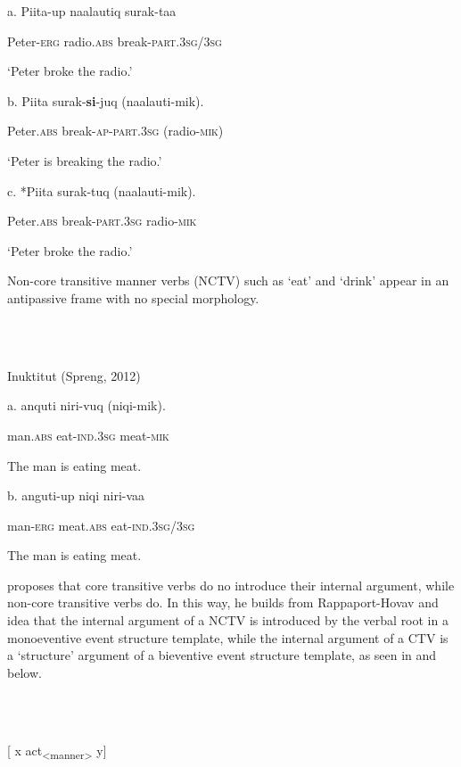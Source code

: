 \documentclass[output=paper,modfonts,nonflat]{langsci/langscibook}
\begin{document}
a.   Piita-up  naalautiq  surak-taa

  Peter{}-\textsc{erg}  radio.\textsc{abs}  break-\textsc{part}.3\textsc{sg}/3\textsc{sg}

  ‘Peter broke the radio.’

b.  Piita    surak-\textbf{si}{}-juq    (naalauti-mik).

  Peter.\textsc{abs}  break-\textsc{ap}{}-\textsc{part}.3\textsc{sg}  (radio{}-\textsc{mik})

  ‘Peter is breaking the radio.’

c.   *Piita    surak-tuq    (naalauti-mik).  

  Peter.\textsc{abs}  break{}-\textsc{part}.3\textsc{sg}  radio{}-\textsc{mik}

  \textsc{‘}Peter broke the radio.’

Non-core transitive manner verbs (NCTV) such as ‘eat’ and ‘drink’ appear in an antipassive frame with no special morphology.  

\ea%
    \label{ex:key:4}
    \gll\\
        \\
    \glt
    \z

          Inuktitut (Spreng, 2012)

a.  anquti  niri-vuq  (niqi-mik).

  man.\textsc{abs}  eat{}-\textsc{ind}.3\textsc{sg}  meat{}-\textsc{mik}

  The man is eating meat.

b.  anguti-up  niqi    niri-vaa

  man{}-\textsc{erg}  meat.\textsc{abs}  eat{}-\textsc{ind}.3\textsc{sg}/3\textsc{sg}

  The man is eating meat.

\citet{Basilico2017} proposes that core transitive verbs do no introduce their internal argument, while non-core transitive verbs do.  In this way, he builds from Rappaport-Hovav and  idea that the internal argument of a NCTV is introduced by the verbal root in a monoeventive event structure template, while the internal argument of a CTV is a ‘structure’ argument of a bieventive event structure template, as seen in  and  below.

\ea%
    \label{ex:key:5}
    \gll\\
        \\
    \glt
    \z

          [ x act\textsubscript{<manner>} y]
\end{document}
